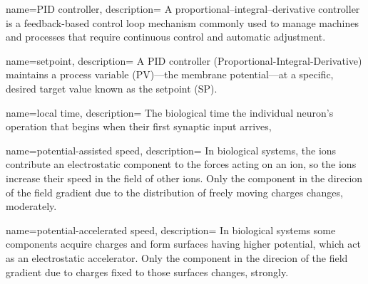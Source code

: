 


{
  name={PID controller},
  description=%
  {A proportional–integral–derivative controller is a feedback-based control loop mechanism commonly used to manage machines and processes that require continuous control and automatic adjustment.}
}

{
  name={setpoint},
  description=%
  {A \gls{PID} controller (Proportional-Integral-Derivative) maintains a process variable (PV)—the membrane potential—at a specific, desired target value known as the setpoint (SP).}
  }

{
    name={local time},
    description=%
    {The biological time the individual neuron's operation
    that begins when their first synaptic input arrives},
}

{
    name={potential-assisted speed},
    description=%
    {In biological systems, the ions contribute
    an electrostatic component to the forces acting on an ion,
    so the ions increase their speed in the field of other ions.
    Only the component in the direcion of the field gradient
    due to the distribution of freely moving charges changes,
    moderately.}
}

{
    name={potential-accelerated speed},
    description=%
    {In biological systems some components
    acquire charges and form surfaces having higher potential,
    which act as an electrostatic accelerator.
    Only the component in the direcion of the field gradient 
    due to charges fixed to those surfaces changes,
    strongly.}
}
